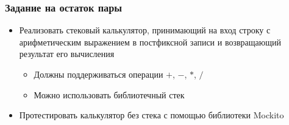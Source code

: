 \documentclass[xetex,mathserif,serif]{beamer}
\begin{document}
	\begin{frame}
		\frametitle{Задание на остаток пары}
		\begin{itemize}
			\item Реализовать стековый калькулятор, принимающий на вход строку с арифметическим выражением в постфиксной записи и возвращающий результат его вычисления
			\begin{itemize}
				\item Должны поддерживаться операции $+$, $-$, $*$, $/$
				\item Можно использовать библиотечный стек
			\end{itemize}
			\item Протестировать калькулятор без стека с помощью библиотеки Mockito
		\end{itemize}
	\end{frame}
\end{document}
